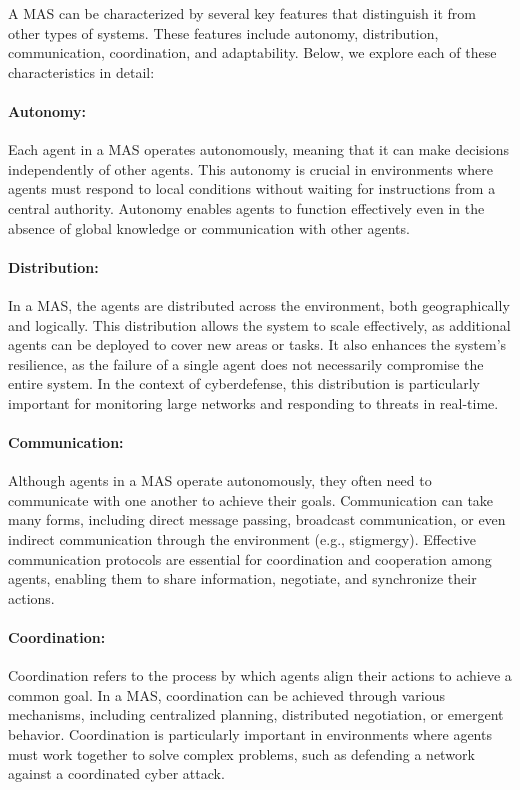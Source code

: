 A MAS can be characterized by several key features that distinguish it from other types of systems. These features include autonomy, distribution, communication, coordination, and adaptability. Below, we explore each of these characteristics in detail:

\paragraph{Autonomy:}
Each agent in a MAS operates autonomously, meaning that it can make decisions independently of other agents. This autonomy is crucial in environments where agents must respond to local conditions without waiting for instructions from a central authority. Autonomy enables agents to function effectively even in the absence of global knowledge or communication with other agents.

\paragraph{Distribution:}
In a MAS, the agents are distributed across the environment, both geographically and logically. This distribution allows the system to scale effectively, as additional agents can be deployed to cover new areas or tasks. It also enhances the system's resilience, as the failure of a single agent does not necessarily compromise the entire system. In the context of cyberdefense, this distribution is particularly important for monitoring large networks and responding to threats in real-time.

\paragraph{Communication:}
Although agents in a MAS operate autonomously, they often need to communicate with one another to achieve their goals. Communication can take many forms, including direct message passing, broadcast communication, or even indirect communication through the environment (e.g., stigmergy). Effective communication protocols are essential for coordination and cooperation among agents, enabling them to share information, negotiate, and synchronize their actions.

\paragraph{Coordination:}
Coordination refers to the process by which agents align their actions to achieve a common goal. In a MAS, coordination can be achieved through various mechanisms, including centralized planning, distributed negotiation, or emergent behavior. Coordination is particularly important in environments where agents must work together to solve complex problems, such as defending a network against a coordinated cyber attack.

